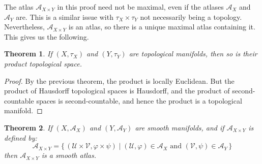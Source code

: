 \documentclass{article}
\theoremstyle{plain}
\newtheorem{theorem}{Theorem}[section]
\theoremstyle{normal}
\begin{document}
        The atlas $\mathcal{A}_{X\times{Y}}$ in this proof need not be maximal,
        even if the atlases $\mathcal{A}_{X}$ and $\mathcal{A}_{Y}$ are.
        This is a similar issue with $\tau_{X}\times\tau_{Y}$ not necessarily
        being a topology. Nevertheless, $\mathcal{A}_{X\times{Y}}$ is an atlas,
        so there is a unique maximal atlas containing it. This gives us the
        following.
        \begin{theorem}
            If $(X,\tau_{X})$ and $(Y,\tau_{Y})$ are topological manifolds,
            then so is their product topological space.
        \end{theorem}
        \begin{proof}
            By the previous theorem, the product is locally Euclidean. But the
            product of Hausdorff topological spaces is Hausdorff, and the
            product of second-countable spaces is second-countable, and hence
            the product is a topological manifold.
        \end{proof}
        \begin{theorem}
            If $(X,\mathcal{A}_{X})$ and $(Y,\mathcal{A}_{Y})$ are smooth
            manifolds, and if $\mathcal{A}_{X\times{Y}}$ is defined by:
            \begin{equation}
                \mathcal{A}_{X\times{Y}}=
                \{\,(\mathcal{U}\times\mathcal{V},\varphi\times\psi)\;|\;
                    (\mathcal{U},\varphi)\in\mathcal{A}_{X}\textrm{ and }
                    (\mathcal{V},\psi)\in\mathcal{A}_{Y}\,\}
            \end{equation}
            then $\mathcal{A}_{X\times{Y}}$ is a smooth atlas.
        \end{theorem}
\end{document}
